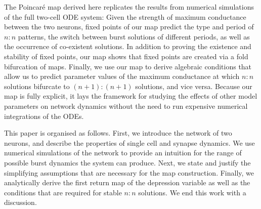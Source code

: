 The Poincaré map derived here replicates the results from numerical simulations of the
full two-cell ODE system: Given the strength of maximum conductance between the two
neurons, fixed points of our map predict the type and period of $n:n$ patterns, the switch
between burst solutions of different periods, as well as the occurrence of co-existent
solutions.
In addition to proving the existence and stability of fixed points, our map shows that fixed points are created via a fold bifurcation of maps.
Finally, we use our map to derive algebraic conditions that allow us to predict parameter values of the maximum conductance at which $n:n$ solutions bifurcate to $(n+1):(n+1)$ solutions, and vice versa.
Because our map is fully explicit, it lays the framework for studying the effects of other model parameters on network dynamics without the need to run expensive numerical integrations of the ODEs.

This paper is organised as follows.
First, we introduce the network of two neurons, and describe the properties of single cell and synapse dynamics.
We use numerical simulations of the network to provide an intuition for the range of possible burst dynamics the system can produce.
Next, we state and justify the simplifying assumptions that are necessary for the map construction.
Finally, we analytically derive the first return map of the depression variable as well as the conditions that are required for stable $n:n$ solutions.
We end this work with a discussion.
